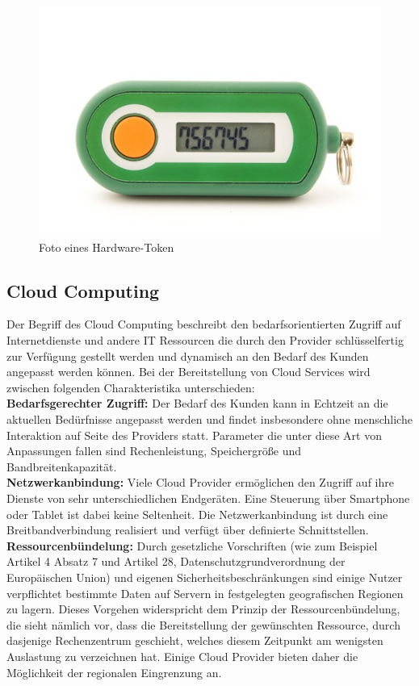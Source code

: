 \documentclass[
book,
a4paper,   
titlepage,  
halfparskip,
12pt        
]{scrartcl}
\begin{document}
\begin{onehalfspacing}
\begin{figure}[h]
	\centering
	\includegraphics[width=0.5\linewidth]{token.jpg}
	\caption[Token]{Foto eines Hardware-Token\cite{token}}
	\label{fig:token}
\end{figure}

\subsection{Cloud Computing}
\label{subsec:cloud}
Der Begriff des Cloud Computing beschreibt den bedarfsorientierten Zugriff auf Internetdienste und andere \ac{IT} Ressourcen die durch den Provider schlüsselfertig zur Verfügung gestellt werden und dynamisch an den Bedarf des Kunden angepasst werden können. Bei der Bereitstellung von Cloud Services wird zwischen folgenden Charakteristika unterschieden\cite[S. 8]{cloudsec}:\\
\textbf{Bedarfsgerechter Zugriff:} Der Bedarf des Kunden kann in Echtzeit an die aktuellen Bedürfnisse angepasst werden und findet insbesondere ohne menschliche Interaktion auf Seite des Providers statt. Parameter die unter diese Art von Anpassungen fallen sind Rechenleistung, Speichergröße und Bandbreitenkapazität.\cite[S. 8]{cloudsec}\\
\textbf{Netzwerkanbindung:}  Viele Cloud Provider ermöglichen den Zugriff auf ihre Dienste von sehr unterschiedlichen Endgeräten. Eine Steuerung über Smartphone oder Tablet ist dabei keine Seltenheit. Die Netzwerkanbindung ist durch eine Breitbandverbindung realisiert und verfügt über definierte Schnittstellen.\cite[S. 8]{cloudsec}\\
\textbf{Ressourcenbündelung:} Durch gesetzliche Vorschriften (wie zum Beispiel Artikel 4 Absatz 7 und Artikel 28, Datenschutzgrundverordnung der Europäischen Union) und eigenen Sicherheitsbeschränkungen sind einige Nutzer verpflichtet bestimmte Daten auf Servern in festgelegten geografischen Regionen zu lagern. Dieses Vorgehen widerspricht dem Prinzip der Ressourcenbündelung, die sieht nämlich vor, dass die Bereitstellung der gewünschten Ressource, durch dasjenige Rechenzentrum geschieht, welches diesem Zeitpunkt am wenigsten Auslastung zu verzeichnen hat. Einige Cloud Provider bieten daher die Möglichkeit der regionalen Eingrenzung an.\cite[S. 8]{cloudsec}\\

\end{onehalfspacing}
\end{document}
